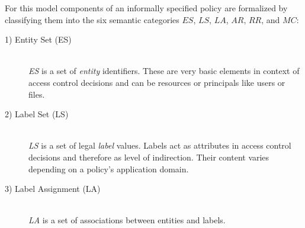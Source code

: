 \documentclass[twoside, openright, 12pt]{book}
\begin{document}
For this model components of an informally specified policy are formalized by classifying them into the six semantic categories $ES$, $LS$, $LA$, $AR$, $RR$, and $MC$:

\begin{description}
\item[1) Entity Set (ES)]\hfill \\
\textit{ES} is a set of \textit{entity} identifiers.
These are very basic elements in context of access control decisions and can be resources or principals like users or files.


\item[2) Label Set (LS)]\hfill \\
\textit{LS} is a set of legal \textit{label} values.
Labels act as attributes in access control decisions and therefore as level of indirection.
Their content varies depending on a policy's application domain.


\item[3) Label Assignment (LA)]\hfill \\
\textit{LA} is a set of associations between entities and labels.



\end{description}
\end{document}
